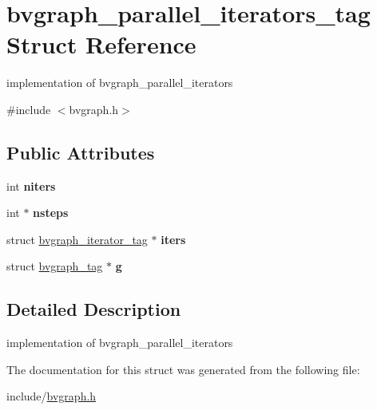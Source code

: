 \hypertarget{structbvgraph__parallel__iterators__tag}{\section{bvgraph\+\_\+parallel\+\_\+iterators\+\_\+tag Struct Reference}
\label{structbvgraph__parallel__iterators__tag}
}


implementation of bvgraph\+\_\+parallel\+\_\+iterators  




{\ttfamily \#include $<$bvgraph.\+h$>$}

\subsection*{Public Attributes}
\begin{DoxyCompactItemize}
\item 
\hypertarget{structbvgraph__parallel__iterators__tag_a05fa431c1a778d3508377e6a00804d99}{int {\bfseries niters}}\label{structbvgraph__parallel__iterators__tag_a05fa431c1a778d3508377e6a00804d99}

\item 
\hypertarget{structbvgraph__parallel__iterators__tag_aa769da67a92d76ce2c1d3bfc4233f3fb}{int $\ast$ {\bfseries nsteps}}\label{structbvgraph__parallel__iterators__tag_aa769da67a92d76ce2c1d3bfc4233f3fb}

\item 
\hypertarget{structbvgraph__parallel__iterators__tag_a9d3c45d147568577ff74bd3a8f77c4d2}{struct \hyperlink{structbvgraph__iterator__tag}{bvgraph\+\_\+iterator\+\_\+tag} $\ast$ {\bfseries iters}}\label{structbvgraph__parallel__iterators__tag_a9d3c45d147568577ff74bd3a8f77c4d2}

\item 
\hypertarget{structbvgraph__parallel__iterators__tag_a3a34bb371ededf6726c34ecf1ca474a6}{struct \hyperlink{structbvgraph__tag}{bvgraph\+\_\+tag} $\ast$ {\bfseries g}}\label{structbvgraph__parallel__iterators__tag_a3a34bb371ededf6726c34ecf1ca474a6}

\end{DoxyCompactItemize}


\subsection{Detailed Description}
implementation of bvgraph\+\_\+parallel\+\_\+iterators 

The documentation for this struct was generated from the following file\+:\begin{DoxyCompactItemize}
\item 
include/\hyperlink{bvgraph_8h}{bvgraph.\+h}\end{DoxyCompactItemize}
